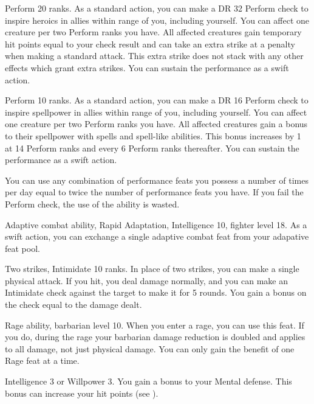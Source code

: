 \featpre Perform 20 ranks.
\featben As a standard action, you can make a DR 32 Perform check to inspire heroics in allies within \rngmed range of you, including yourself.
You can affect one creature per two Perform ranks you have.
All affected creatures gain temporary hit points equal to your check result and can take an extra strike at a  penalty when making a standard attack.
This extra strike does not stack with any other effects which grant extra strikes.
You can sustain the performance as a swift action.

\featpre Perform 10 ranks.
\featben As a standard action, you can make a DR 16 Perform check to inspire spellpower in allies within \rngmed range of you, including yourself.
You can affect one creature per two Perform ranks you have.
All affected creatures gain a  bonus to their spellpower with spells and spell-like abilities.
This bonus increases by 1 at 14 Perform ranks and every 6 Perform ranks thereafter.
You can sustain the performance as a swift action.

You can use any combination of performance feats you possess a number of times per day equal to twice the number of performance feats you have.
If you fail the Perform check, the use of the ability is wasted.

\featpre Adaptive combat ability, Rapid Adaptation, Intelligence 10, fighter level 18.
\featben As a swift action, you can exchange a single adaptive combat feat from your adapative feat pool.

\featpres Two strikes, Intimidate 10 ranks.
\featben In place of two strikes, you can make a single physical attack.
If you hit, you deal damage normally, and you can make an Intimidate check against the target to make it \shaken for 5 rounds.
You gain a bonus on the check equal to the damage dealt.

\featpre Rage ability, barbarian level 10.
\featben When you enter a rage, you can use this feat. If you do, during the rage your barbarian damage reduction is doubled and applies to all damage, not just physical damage.
 You can only gain the benefit of one Rage feat at a time.

\featpre Intelligence 3 or Willpower 3.
\featben You gain a  bonus to your Mental defense.
This bonus can increase your hit points (see ).

